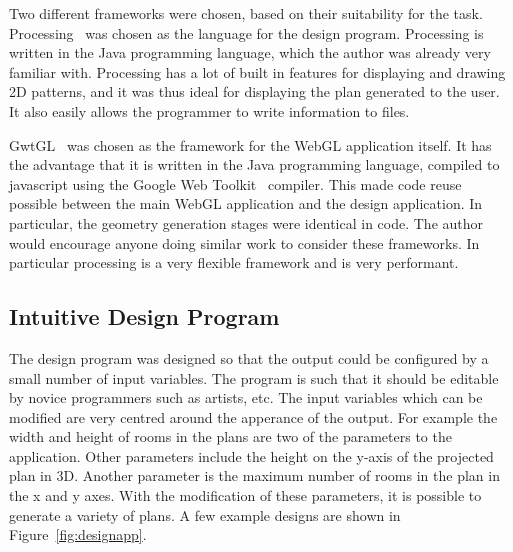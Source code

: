 Two different frameworks were chosen, based on their suitability for the task.
Processing~\cite{web:processing} was chosen as the language for the design program.
Processing is written in the Java programming language, which the author was already very familiar with.
Processing has a lot of built in features for displaying and drawing 2D patterns, and it was thus ideal for displaying the plan generated to the user.
It also easily allows the programmer to write information to files.

GwtGL~\cite{web:gwtgl} was chosen as the framework for the WebGL application itself.
It has the advantage that it is written in the Java programming language, compiled to javascript using the Google Web Toolkit~\cite{web:gwt} compiler.
This made code reuse possible between the main WebGL application and the design application.
In particular, the geometry generation stages were identical in code.
The author would encourage anyone doing similar work to consider these frameworks.
In particular processing is a very flexible framework and is very performant.

\subsection{Intuitive Design Program}
The design program was designed so that the output could be configured by a small number of input variables.
The program is such that it should be editable by novice programmers such as artists, etc.
The input variables which can be modified are very centred around the apperance of the output.
For example the width and height of rooms in the plans are two of the parameters to the application.
Other parameters include the height on the y-axis of the projected plan in 3D.
Another parameter is the maximum number of rooms in the plan in the x and y axes.
With the modification of these parameters, it is possible to generate a variety of plans.
A few example designs are shown in Figure~\ref{fig:designapp}.

